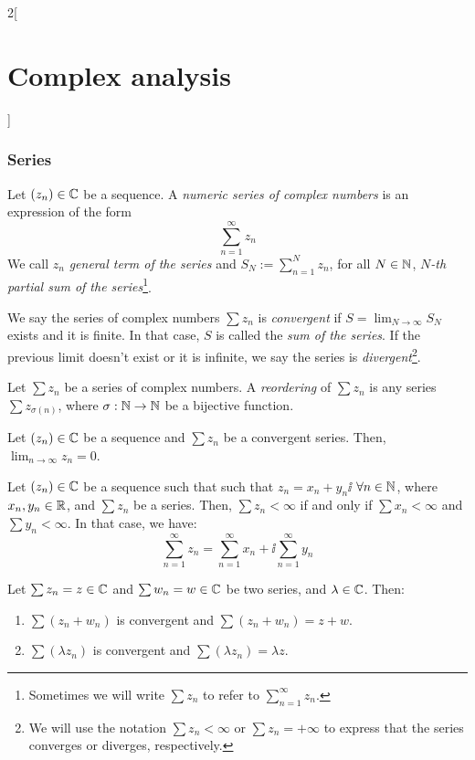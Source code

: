 \documentclass[../../../main.tex]{subfiles}
\begin{document}
\begin{multicols}{2}[\section{Complex analysis}]
  \subsubsection{Series}
  \begin{definition}
    Let $(z_n)\in\mathbb{C}$ be a sequence. A \emph{numeric series of complex numbers} is an expression of the form $$\sum_{n=1}^\infty z_n$$ We call $z_n$ \emph{general term of the series} and $\displaystyle S_N:=\sum_{n=1}^N z_n$, for all $N\in\mathbb{N} $, \emph{$N$-th partial sum of the series}\footnote{Sometimes we will write $\sum z_n$ to refer to $\displaystyle\sum_{n=1}^\infty z_n$.}.
  \end{definition}
  \begin{definition}
    We say the series of complex numbers $\sum z_n$ is \emph{convergent} if $\displaystyle S=\lim_{N\to\infty}S_N$ exists and it is finite. In that case, $S$ is called the \emph{sum of the series}. If the previous limit doesn't exist or it is infinite, we say the series is \emph{divergent}\footnote{We will use the notation $\sum z_n<\infty$ or $\sum z_n=+\infty$ to express that the series converges or diverges, respectively.}.
  \end{definition}
  \begin{definition}
    Let $\sum z_n$ be a series of complex numbers. A \emph{reordering} of $\sum z_n$ is any series $\sum z_{\sigma(n)}$, where $\sigma:\mathbb{N}\rightarrow\mathbb{N}$ be a bijective function.
  \end{definition}
  \begin{proposition}
    Let $(z_n)\in\mathbb{C}$ be a sequence and $\sum z_n$ be a convergent series. Then, $\displaystyle\lim_{n\to\infty}z_n =0$.
  \end{proposition}
  \begin{proposition}
    Let $(z_n)\in\mathbb{C}$ be a sequence such that such that $z_n=x_n+y_n\ii$ $\forall n\in\mathbb{N}$, where $x_n,y_n\in\mathbb{R}$, and $\sum z_n$ be a series. Then, $\sum z_n<\infty$ if and only if $\sum x_n<\infty$ and $\sum y_n<\infty$. In that case, we have: $$\sum_{n=1}^\infty z_n=\sum_{n=1}^\infty x_n+\ii\sum_{n=1}^\infty y_n$$
  \end{proposition}
  \begin{proposition}
    Let $\sum z_n=z\in\mathbb{C}$ and $\sum w_n=w\in\mathbb{C}$ be two series, and $\lambda\in\mathbb{C}$. Then:
    \begin{enumerate}
      \item $\sum (z_n+w_n)$ is convergent and $\sum (z_n+w_n)=z+w$.
      \item $\sum (\lambda z_n)$ is convergent and $\sum (\lambda z_n)=\lambda z$.

\end{enumerate}
\end{proposition}
\end{multicols}
\end{document}

